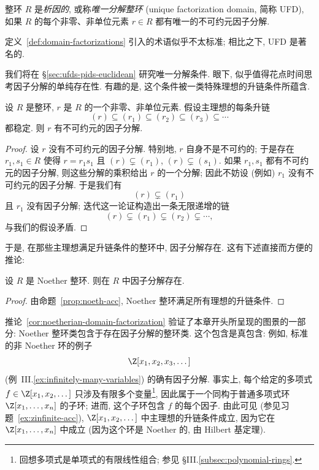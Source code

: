 \begin{definition}\label{def:ufd}
整环 $R$ 是\emph{析因的}, 或称\emph{唯一分解整环} (unique factorization domain, 简称 UFD), 如果 $R$ 的每个非零、非单位元素 $r\in R$ 都有唯一的不可约元因子分解.
\end{definition}

定义~\ref{def:domain-factorizations} 引入的术语似乎不太标准; 相比之下, UFD 是著名的.

我们将在 §\ref{sec:ufds-pids-euclidean} 研究唯一分解条件. 眼下, 似乎值得花点时间思考因子分解的单纯存在性. 有趣的是, 这个条件被一类特殊理想的升链条件所蕴含.

\begin{proposition}\label{prop:acc-factorization}
设 $R$ 是整环, $r$ 是 $R$ 的一个非零、非单位元素. 假设主理想的每条升链
\[
(r)\subseteq (r_1)\subseteq (r_2)\subseteq (r_3)\subseteq \cdots
\]
都稳定. 则 $r$ 有不可约元的因子分解.
\end{proposition}

\begin{proof}
设 $r$ 没有不可约元的因子分解. 特别地, $r$ 自身不是不可约的; 于是存在 $r_1,s_1\in R$ 使得 $r = r_1 s_1$ 且 $(r)\subsetneq (r_1)$, $(r)\subsetneq (s_1)$. 如果 $r_1,s_1$ 都有不可约元的因子分解, 则这些分解的乘积给出 $r$ 的一个分解; 因此不妨设 (例如) $r_1$ 没有不可约元的因子分解. 于是我们有
\[
(r)\subsetneq (r_1)
\]
且 $r_1$ 没有因子分解; 迭代这一论证构造出一条无限递增的链
\[
(r)\subsetneq (r_1)\subsetneq (r_2)\subsetneq \cdots,
\]
与我们的假设矛盾.
\end{proof}

于是, 在那些主理想满足升链条件的整环中, 因子分解存在. 这有下述直接而方便的推论:

\begin{corollary}\label{cor:noetherian-domain-factorization}
设 $R$ 是 Noether 整环. 则在 $R$ 中因子分解存在.
\end{corollary}

\begin{proof}
由命题~\ref{prop:noeth-acc}, Noether 整环满足所有理想的升链条件.
\end{proof}

推论~\ref{cor:noetherian-domain-factorization} 验证了本章开头所呈现的图景的一部分: Noether 整环类包含于存在因子分解的整环类. 这个包含是真包含: 例如, 标准的非 Noether 环的例子
\[
\Z[x_1,x_2,x_3,\dots]
\]
(例~III.\ref{ex:infinitely-many-variables}) 的确有因子分解. 事实上, 每个给定的多项式 $f\in \Z[x_1,x_2,\dots]$ 只涉及有限多个变量\footnote{回想多项式是单项式的有限线性组合; 参见 §III.\ref{subsec:polynomial-rings}.}, 因此属于一个同构于普通多项式环 $\Z[x_1,\dots,x_n]$ 的子环; 进而, 这个子环包含 $f$ 的每个因子. 由此可见 (参见习题~\ref{ex:zinfinite-acc}), $\Z[x_1,x_2,\dots]$ 中主理想的升链条件成立, 因为它在 $\Z[x_1,\dots,x_n]$ 中成立 (因为这个环是 Noether 的, 由 Hilbert 基定理).

